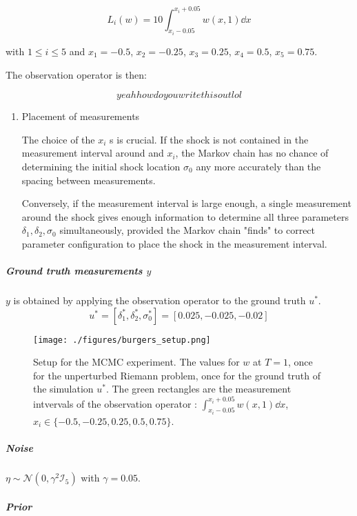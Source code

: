 \documentclass[11pt]{article}
\newcommand{\I}{{\mathcal{I}}}
\newcommand{\N}[2]{\mathcal{N}\left(#1,#2\right)}
\begin{document}
\begin{equation}
L_i(w) = 10 \int_{x_i - 0.05}^{x_i + 0.05} w(x, 1) \dd x
\end{equation}

with \(1 \leq i \leq 5\) and \(x_1 = -0.5\), \(x_2= -0.25\), \(x_3 = 0.25\), \(x_4 = 0.5\), \(x_5 = 0.75\).

The observation operator is then:

$$yeah how do you write this out lol$$

\begin{enumerate}
\item Placement of measurements
\label{sec:org3a9328d}

The choice of the \(x_i\) s is crucial. If the shock is not contained in the measurement
interval around and \(x_i\), the Markov chain has no chance of determining the initial
shock location \(\sigma_0\) any more accurately than the spacing between measurements.

Conversely, if the measurement interval is large enough, a single measurement around the
shock gives enough information to determine all three parameters \(\delta_1, \delta_2, \sigma_0\)
simultaneously, provided the Markov chain "finds" to correct parameter configuration to place the
shock in the measurement interval.
\end{enumerate}

\subparagraph{Ground truth measurements \(y\)}
\label{sec:orgb580cf1}

\(y\) is obtained by applying the observation operator to the ground truth \(u^*\).
$$u^* = [\delta_1^*, \delta_2^*, \sigma_0^*] = [0.025, -0.025, -0.02]$$

\begin{figure}[htbp]
\centering
\texttt{[image: ./figures/burgers\_setup.png]}
\caption{\label{fig:burgers_setup}
Setup for the MCMC experiment. The values for \(w\) at \(T=1\), once for the unperturbed Riemann problem, once for the ground truth of the simulation \(u^*\). The green rectangles are the measurement intvervals of the observation operator : \(\int_{x_i - 0.05}^{x_i + 0.05} w(x,1)\dd x\), \(x_i \in \{ -0.5, -0.25, 0.25, 0.5, 0.75 \}\).}
\end{figure}

\subparagraph{Noise}
\label{sec:orgda5415e}

\(\eta \sim \N{0}{\gamma^2 \I_5}\) with \(\gamma = 0.05\).

\subparagraph{Prior}
\label{sec:org53817d0}
\end{document}
